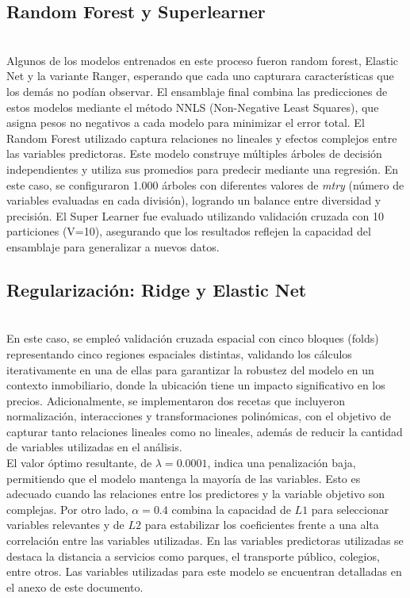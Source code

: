 \documentclass[a4paper]{article}
\theoremstyle{remark}
\theoremstyle{definition}
\begin{document}
\subsection{Random Forest y Superlearner} \\

Algunos de los modelos entrenados en este proceso fueron random forest, Elastic Net y la variante Ranger, esperando que cada uno capturara características que los demás no podían observar. El ensamblaje final combina las predicciones de estos modelos mediante el método NNLS (Non-Negative Least Squares), que asigna pesos no negativos a cada modelo para minimizar el error total. El Random Forest utilizado captura relaciones no lineales y efectos complejos entre las variables predictoras. Este modelo construye múltiples árboles de decisión independientes y utiliza sus promedios para predecir mediante una regresión. En este caso, se configuraron 1.000 árboles con diferentes valores de \textit{mtry} (número de variables evaluadas en cada división), logrando un balance entre diversidad y precisión. El Super Learner fue evaluado utilizando validación cruzada con 10 particiones (V=10), asegurando que los resultados reflejen la capacidad del ensamblaje para generalizar a nuevos datos.

\subsection{Regularización: Ridge y Elastic Net} \\

En este caso, se empleó validación cruzada espacial con cinco bloques (folds) representando cinco regiones espaciales distintas, validando los cálculos iterativamente en una de ellas para garantizar la robustez del modelo en un contexto inmobiliario, donde la ubicación tiene un impacto significativo en los precios. Adicionalmente, se implementaron dos recetas que incluyeron normalización, interacciones y transformaciones polinómicas, con el objetivo de capturar tanto relaciones lineales como no lineales, además de reducir la cantidad de variables utilizadas en el análisis. \\

El valor óptimo resultante, de \(\lambda = 0.0001\), indica una penalización baja, permitiendo que el modelo mantenga la mayoría de las variables. Esto es adecuado cuando las relaciones entre los predictores y la variable objetivo son complejas. Por otro lado, \(\alpha = 0.4\) combina la capacidad de \(L1\) para seleccionar variables relevantes y de \(L2\) para estabilizar los coeficientes frente a una alta correlación entre las variables utilizadas. En las variables predictoras utilizadas se destaca la distancia a servicios como parques, el transporte público, colegios, entre otros. Las variables utilizadas para este modelo se encuentran detalladas en el anexo de este documento. 
\end{document}
